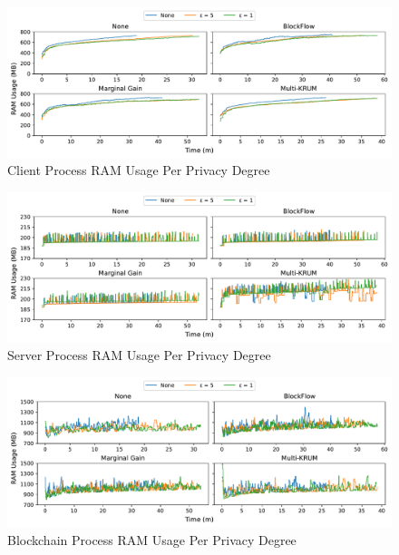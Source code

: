 \clearpage

\begin{figure}[!h]
    \centering
    \includegraphics[width=\textwidth]{graphics/privacy/ram_client.pdf}
    \caption{Client Process RAM Usage Per Privacy Degree}
    \label{fig:ram_privacy_clients}
\end{figure}

\vfill

\begin{figure}[!h]
    \centering
    \includegraphics[width=\textwidth]{graphics/privacy/ram_server.pdf}
    \caption{Server Process RAM Usage Per Privacy Degree}
    \label{fig:ram_privacy_servers}
\end{figure}

\vfill

\begin{figure}[!h]
    \centering
    \includegraphics[width=\textwidth]{graphics/privacy/ram_miner.pdf}
    \caption{Blockchain Process RAM Usage Per Privacy Degree}
    \label{fig:ram_privacy_miners}
\end{figure}

